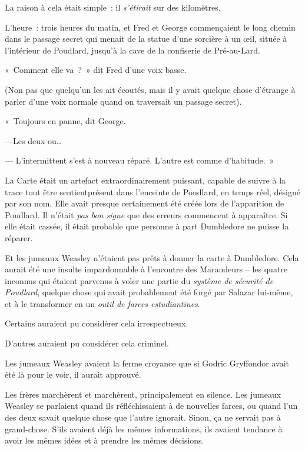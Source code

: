 La raison à cela était simple~: il \emph{s'étirait} sur des kilomètres.

L'heure~: trois heures du matin, et Fred et George commençaient le long chemin dans le passage secret qui menait de la statue d'une sorcière à un œil, située à l'intérieur de Poudlard, jusqu'à la cave de la confiserie de Pré-au-Lard.

«~Comment elle va~?~»
dit Fred d'une voix basse.

(Non pas que quelqu'un les ait écoutés, mais il y avait quelque chose d'étrange à parler d'une voix normale quand on traversait un passage secret).

«~Toujours en panne, dit George.

---Les deux ou…

--- L'intermittent s'est à nouveau réparé.
L'autre est comme d'habitude.~»

La Carte était un artefact extraordinairement puissant, capable de suivre à la trace tout être sentient\protect\footnotemark présent dans l'enceinte de Poudlard, en temps réel, désigné par son nom.
Elle avait presque certainement été créée lors de l'apparition de Poudlard.
Il n'était \emph{pas bon signe} que des erreurs commencent à apparaître.
Si elle était cassée, il était probable que personne à part Dumbledore ne puisse la réparer.

Et les jumeaux Weasley n'étaient pas prêts à donner la carte à Dumbledore.
Cela aurait été une insulte impardonnable à l'encontre des Maraudeurs -- les quatre inconnus qui étaient parvenus à voler une partie du \emph{système de sécurité de Poudlard}, quelque chose qui avait probablement été forgé par Salazar lui-même, et à le transformer en un \emph{outil de farces estudiantines}.

Certains auraient pu considérer cela irrespectueux.

D'autres auraient pu considérer cela criminel.

Les jumeaux Weasley avaient la ferme croyance que si Godric Gryffondor avait été là pour le voir, il aurait approuvé.

Les frères marchèrent et marchèrent, principalement en silence.
Les jumeaux Weasley se parlaient quand ils réfléchissaient à de nouvelles farces, ou quand l'un des deux savait quelque chose que l'autre ignorait.
Sinon, ça ne servait pas à grand-chose.
S'ils avaient déjà les mêmes informations, ils avaient tendance à avoir les mêmes idées et à prendre les mêmes décisions.

